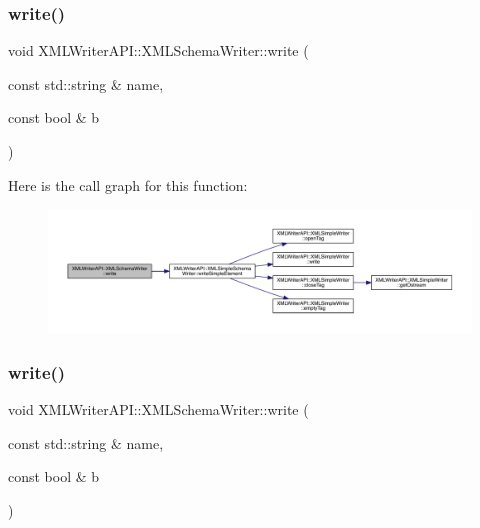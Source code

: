 \subsubsection{\texorpdfstring{write()}{write()}\hspace{0.1cm}{\footnotesize\ttfamily [14/15]}}
{\footnotesize\ttfamily void X\+M\+L\+Writer\+A\+P\+I\+::\+X\+M\+L\+Schema\+Writer\+::write (\begin{DoxyParamCaption}\item[{const std\+::string \&}]{name,  }\item[{const bool \&}]{b }\end{DoxyParamCaption})\hspace{0.3cm}{\ttfamily [inline]}}

Here is the call graph for this function\+:
\nopagebreak
\begin{figure}[H]
\begin{center}
\leavevmode
\includegraphics[width=350pt]{db/d34/classXMLWriterAPI_1_1XMLSchemaWriter_a0d6bf66ccbb217c4db704568f9c377fe_cgraph}
\end{center}
\end{figure}
\mbox{\label{classXMLWriterAPI_1_1XMLSchemaWriter_a0d6bf66ccbb217c4db704568f9c377fe}} 
\subsubsection{\texorpdfstring{write()}{write()}\hspace{0.1cm}{\footnotesize\ttfamily [15/15]}}
{\footnotesize\ttfamily void X\+M\+L\+Writer\+A\+P\+I\+::\+X\+M\+L\+Schema\+Writer\+::write (\begin{DoxyParamCaption}\item[{const std\+::string \&}]{name,  }\item[{const bool \&}]{b }\end{DoxyParamCaption})\hspace{0.3cm}{\ttfamily [inline]}}

